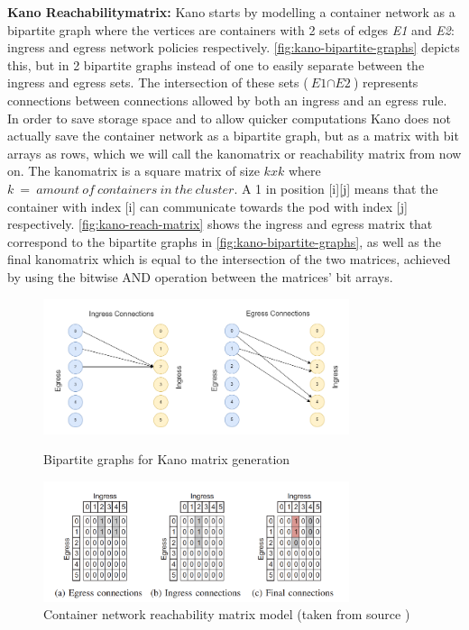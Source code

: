 \textbf{Kano Reachabilitymatrix:} \label{kano:matrix} Kano starts by modelling a container network as a bipartite graph where the vertices are containers with 2 sets of edges \textit{E1} and \textit{E2}: ingress and egress network policies respectively. \autoref{fig:kano-bipartite-graphs} depicts this, but in 2 bipartite graphs instead of one to easily separate between the ingress and egress sets. The intersection of these sets  ($\textit{E1} \cap \textit{E2}$) represents connections between connections allowed by both an ingress and an egress rule. In order to save storage space and to allow quicker computations Kano does not actually save the container network as a bipartite graph, but as a matrix with bit arrays as rows, which we will call the kanomatrix or reachability matrix from now on. The kanomatrix is a square matrix of size \(kxk\) where \(k\ =\ amount\  of\  containers\  in\  the\  cluster\). A 1 in position [i][j] means that the container with index [i] can communicate towards the pod with index [j] respectively. \autoref{fig:kano-reach-matrix} shows the ingress and egress matrix that correspond to the bipartite graphs in \autoref{fig:kano-bipartite-graphs}, as well as the final kanomatrix which is equal to the intersection of the two matrices, achieved by using the bitwise AND operation between the matrices' bit arrays.
\\[10pt]
\begin{figure}
\centering
    \begin{minipage}[b]{0.8\linewidth}
        \centering
        \includegraphics[width=0.8\textwidth]{images/kano-combined-connections-graph.png} 
        \caption{Bipartite graphs for Kano matrix generation} 
        \label{fig:kano-bipartite-graphs}
    \end{minipage}
    \begin{minipage}[b]{0.8\linewidth}
         \centering
          \includegraphics[width=0.8\textwidth]{images/kano-matrix-generation.png} 
          \caption{Container network reachability matrix model (taken from source \cite{kano})} 
          \label{fig:kano-reach-matrix}
    \end{minipage}
      
\end{figure}

